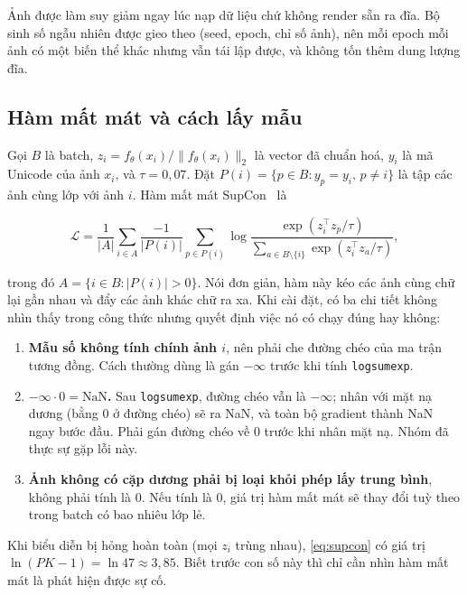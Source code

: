\documentclass[conference,a4paper]{IEEEtran}
\newcommand{\code}[1]{{\small\texttt{#1}}}
\begin{document}
Ảnh được làm suy giảm ngay lúc nạp dữ liệu chứ không render sẵn ra đĩa. Bộ sinh số ngẫu nhiên được
gieo theo (seed, epoch, chỉ số ảnh), nên mỗi epoch mỗi ảnh có một biến thể khác nhưng vẫn tái lập
được, và không tốn thêm dung lượng đĩa.

\subsection{Hàm mất mát và cách lấy mẫu}
\label{sec:loss}

Gọi $B$ là batch, $z_i = f_\theta(x_i)/\lVert f_\theta(x_i)\rVert_2$ là vector đã chuẩn hoá,
$y_i$ là mã Unicode của ảnh $x_i$, và $\tau = 0{,}07$. Đặt $P(i) = \{p \in B : y_p = y_i,\, p \neq
i\}$ là tập các ảnh cùng lớp với ảnh $i$. Hàm mất mát SupCon~\cite{supcon} là

\begin{equation}
\label{eq:supcon}
\mathcal{L} = \frac{1}{|A|}\sum_{i \in A}
\frac{-1}{|P(i)|}\sum_{p \in P(i)}
\log \frac{\exp(z_i^{\!\top} z_p/\tau)}
          {\displaystyle\sum_{a \in B \setminus \{i\}} \exp(z_i^{\!\top} z_a/\tau)},
\end{equation}

trong đó $A = \{i \in B : |P(i)| > 0\}$. Nói đơn giản, hàm này kéo các ảnh cùng chữ lại gần nhau và
đẩy các ảnh khác chữ ra xa. Khi cài đặt, có ba chi tiết không nhìn thấy trong công thức nhưng quyết
định việc nó có chạy đúng hay không:

\begin{enumerate}
  \item \textbf{Mẫu số không tính chính ảnh $i$}, nên phải che đường chéo của ma trận tương đồng.
        Cách thường dùng là gán $-\infty$ trước khi tính \code{logsumexp}.
  \item \textbf{$-\infty \cdot 0 = \mathrm{NaN}$.} Sau \code{logsumexp}, đường chéo vẫn là
        $-\infty$; nhân với mặt nạ dương (bằng 0 ở đường chéo) sẽ ra NaN, và toàn bộ gradient thành
        NaN ngay bước đầu. Phải gán đường chéo về 0 trước khi nhân mặt nạ. Nhóm đã thực sự gặp lỗi
        này.
  \item \textbf{Ảnh không có cặp dương phải bị loại khỏi phép lấy trung bình}, không phải tính là 0.
        Nếu tính là 0, giá trị hàm mất mát sẽ thay đổi tuỳ theo trong batch có bao nhiêu lớp lẻ.
\end{enumerate}

Khi biểu diễn bị hỏng hoàn toàn (mọi $z_i$ trùng nhau), \eqref{eq:supcon} có giá trị
$\ln(PK - 1) = \ln 47 \approx 3{,}85$. Biết trước con số này thì chỉ cần nhìn hàm mất mát là phát
hiện được sự cố.
\end{document}
